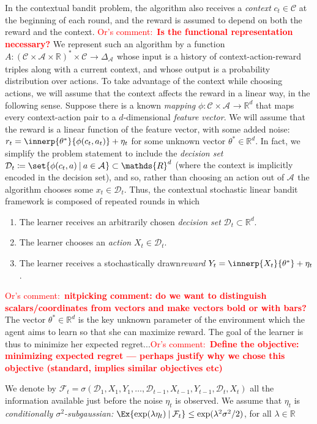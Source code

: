 \documentclass{article}
\newcommand{\os}[1]{\textcolor{red}{Or's comment:~\textbf{#1}}}
\newcommand{\defeq}{\coloneq}
\newcommand{\Real}{\mathds{R}}
\newcommand\given[1][\delimsize]{%
  \providecommand{\delimsize}{}
  \nonscript\:#1\vert\allowbreak\nonscript\:\mathopen{}
}
\newcommand{\C}{\mathcal{C}}
\newcommand{\Aset}[1]{\mathcal{A}_{#1}}
\newcommand{\Dset}[1]{\mathcal{D}_{#1}}
\newcommand{\Cset}[1]{\mathcal{C}_{#1}}
\begin{document}
In the contextual bandit problem, the algorithm also receives a
\emph{context} $c_t\in\C$ at the beginning of each round, and the reward
is assumed to depend on both the reward and the context. 
\os{Is the functional representation necessary?}  We represent such an algorithm by a function
$A : (\Cset{}\times\Aset{}\times\Real)^* \times \Cset{} \to
\Delta_{\Aset{}}$ whose input is a history of context-action-reward
triples along with a current context, and whose output is a
probability distribution over actions.  
To take advantage of the context while choosing actions, we will
assume that the context affects the reward in a linear way, in the
following sense.  Suppose there is a known \emph{mapping}
$\phi:\Cset{}\times\Aset{}\to\Real^d$ that maps every context-action
pair to a $d$-dimensional \emph{feature vector}.  We will assume that
the reward is a linear function of the feature vector, with some added
noise: $r_t = \innerp{\theta^*}{\phi(c_t,a_t)} + \eta_t$ for some
unknown vector $\theta^*\in\Real^d$. In fact, we simplify the problem statement to include the \emph{decision set}
$\Dset{t} \defeq \set{\phi(c_t,a)\given a\in\Aset{}} \subset \Real^d$
(where the context is implicitly encoded in the decision set), and so, rather than choosing an action out of $\Aset{}$ the algorithm chooses some
$x_t\in\Dset{t}$.
Thus, the contextual stochastic linear bandit framework is composed of repeated rounds in which
\begin{enumerate}
\item The learner receives an arbitrarily chosen \emph{decision set} $\mathcal{D}_t \subset
  \Real^d$.
\item The learner chooses an \emph{action} $X_t \in \mathcal{D}_t$.
\item The learner receives a  stochastically drawn\emph{reward}  $Y_t = \innerp{X_t}{\theta^*} + \eta_t$.
\end{enumerate}
\os{nitpicking comment: do we want to distinguish scalars/coordinates from vectors and make vectors bold or with bars?} The vector $\theta^*\in\Real^d$ is the key unknown parameter of the
environment which the agent aims to learn so that she can maximize reward. The goal of the learner is thus to minimize her expected regret...\os{Define the objective: minimizing expected regret --- perhaps justify why we chose this objective (standard, implies similar objectives etc)}

\begin{assumption}\label{assumption:subgaussian-noise}
  We denote by
  $\mathcal{F}_t =
  \sigma(\mathcal{D}_1,X_1,Y_1,\dotsc,\mathcal{D}_{t-1},X_{t-1},Y_{t-1},\mathcal{D}_t,X_t)$
  all the information available just before the noise $\eta_t$ is
  observed.  We assume that $\eta_t$ is \emph{conditionally
    $\sigma^2$-subgaussian:}
  $
    \Ex{\exp(\lambda\eta_t)\given \mathcal{F}_t} \le \exp(\lambda^2\sigma^2/2)$,
    for all  $\lambda\in\Real$
\end{assumption}
\end{document}
